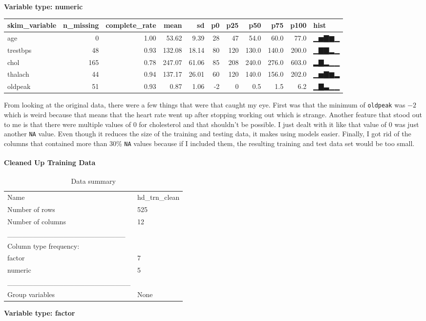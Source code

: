 \documentclass[
]{article}
\begin{document}
\textbf{Variable type: numeric}

\begin{longtable}[]{@{}lrrrrrrrrrl@{}}
\toprule
skim\_variable & n\_missing & complete\_rate & mean & sd & p0 & p25 &
p50 & p75 & p100 & hist\tabularnewline
\midrule
\endhead
age & 0 & 1.00 & 53.62 & 9.39 & 28 & 47 & 54.0 & 60.0 & 77.0 &
▁▅▇▆▁\tabularnewline
trestbps & 48 & 0.93 & 132.08 & 18.14 & 80 & 120 & 130.0 & 140.0 & 200.0
& ▁▇▇▂▁\tabularnewline
chol & 165 & 0.78 & 247.07 & 61.06 & 85 & 208 & 240.0 & 276.0 & 603.0 &
▂▇▂▁▁\tabularnewline
thalach & 44 & 0.94 & 137.17 & 26.01 & 60 & 120 & 140.0 & 156.0 & 202.0
& ▁▅▇▆▂\tabularnewline
oldpeak & 51 & 0.93 & 0.87 & 1.06 & -2 & 0 & 0.5 & 1.5 & 6.2 &
▁▇▃▁▁\tabularnewline
\bottomrule
\end{longtable}

From looking at the original data, there were a few things that were
that caught my eye. First was that the minimum of \texttt{oldpeak} was
\(-2\) which is weird because that means that the heart rate went up
after stopping working out which is strange. Another feature that stood
out to me is that there were multiple values of 0 for cholesterol and
that shouldn't be possible. I just dealt with it like that value of 0
was just another \texttt{NA} value. Even though it reduces the size of
the training and testing data, it makes using models easier. Finally, I
got rid of the columns that contained more than 30\% \texttt{NA} values
because if I included them, the resulting training and test data set
would be too small.

\hypertarget{cleaned-up-training-data}{%
\paragraph{Cleaned Up Training Data}\label{cleaned-up-training-data}}

\begin{longtable}[]{@{}ll@{}}
\caption{Data summary}\tabularnewline
\toprule
\endhead
Name & hd\_trn\_clean\tabularnewline
Number of rows & 525\tabularnewline
Number of columns & 12\tabularnewline
\_\_\_\_\_\_\_\_\_\_\_\_\_\_\_\_\_\_\_\_\_\_\_ &\tabularnewline
Column type frequency: &\tabularnewline
factor & 7\tabularnewline
numeric & 5\tabularnewline
\_\_\_\_\_\_\_\_\_\_\_\_\_\_\_\_\_\_\_\_\_\_\_\_ &\tabularnewline
Group variables & None\tabularnewline
\bottomrule
\end{longtable}

\textbf{Variable type: factor}
\end{document}
